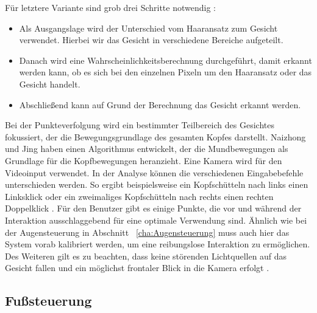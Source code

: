 \newline \newline
Für letztere Variante sind grob drei Schritte notwendig \cite{FaceTracking}:
\begin{itemize}
      \item Als Ausgangslage wird der Unterschied vom Haaransatz zum Gesicht verwendet. Hierbei wir das Gesicht in verschiedene Bereiche aufgeteilt.
			\item Danach wird eine Wahrscheinlichkeitsberechnung durchgeführt, damit erkannt werden kann, ob es sich bei den einzelnen Pixeln um den Haaransatz oder das Gesicht handelt.
			\item Abschließend kann auf Grund der Berechnung das Gesicht erkannt werden.
\end{itemize}
\vspace{\baselineskip}
Bei der Punkteverfolgung wird ein bestimmter Teilbereich des Gesichtes fokussiert, der die Bewegungsgrundlage des gesamten Kopfes darstellt. Naizhong und Jing \cite{MouthChinaControl} haben einen Algorithmus entwickelt, der die Mundbewegungen als Grundlage für die Kopfbewegungen heranzieht. Eine Kamera wird für den Videoinput verwendet. In der Analyse können die verschiedenen Eingabebefehle unterschieden werden. So ergibt beispielsweise ein Kopfschütteln nach links einen Linksklick oder ein zweimaliges Kopfschütteln nach rechts einen rechten Doppelklick \cite{MouthChinaControl}.
\newline \newline
Für den Benutzer gibt es einige Punkte, die vor und während der Interaktion ausschlaggebend für eine optimale Verwendung sind. Ähnlich wie bei der Augensteuerung in Abschnitt ~\ref{cha:Augensteuerung} muss auch hier das System vorab kalibriert werden, um eine reibungslose Interaktion zu ermöglichen. Des Weiteren gilt es zu beachten, dass keine störenden Lichtquellen auf das Gesicht fallen und ein möglichst frontaler Blick in die Kamera erfolgt \cite{MouthChinaControl}.


\subsection{Fußsteuerung}

